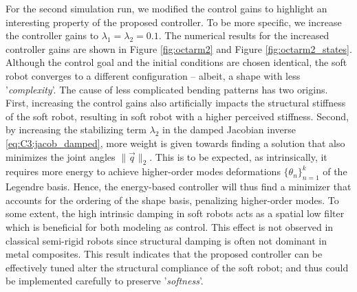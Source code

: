 \begin{example}
For the second simulation run, we modified the control gains to highlight an interesting property of the proposed controller. To be more specific, we increase the controller gains to $\lambda_1 = \lambda_2 = 0.1$. The numerical results for the increased controller gains are shown in Figure \ref{fig:octarm2} and Figure \ref{fig:octarm2_states}. Although the control goal and the initial conditions are chosen identical, the soft robot converges to a different configuration -- albeit, a shape with less '\textit{complexity}'. The cause of less complicated bending patterns has two origins. First, increasing the control gains also artificially impacts the structural stiffness of the soft robot, resulting in soft robot with a higher perceived stiffness. Second, by increasing the stabilizing term $\lambda_2$ in the damped Jacobian inverse \eqref{eq:C3:jacob_damped}, more weight is given towards finding a solution that also minimizes the joint angles $\lVert \vec{q} \rVert_2 $. \editl This is to be expected, as intrinsically, it requires more energy to achieve higher-order modes deformations $\{\theta_n\}_{n=1}^k$ of the Legendre basis. Hence, the energy-based controller will thus find a minimizer that accounts for the ordering of the shape basis, penalizing higher-order modes. To some extent, the high intrinsic damping in soft robots acts as a spatial low filter which is beneficial for both modeling as control. This effect is not observed in classical semi-rigid robots since structural damping is often not dominant in metal composites. \editr This result indicates that the proposed controller can be effectively tuned alter the structural compliance of the soft robot; and thus could be implemented carefully to preserve '\textit{softness}'. 

\end{example}


